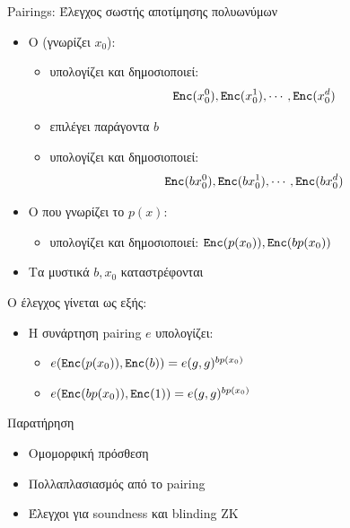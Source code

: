\documentclass[handout]{beamer}
\begin{document}
\begin{frame}[allowframebreaks]{Pairings: Έλεγχος σωστής αποτίμησης πολυωνύμων}
	\begin{itemize}
		\item O \ver (γνωρίζει $x_0$):  
		\begin{itemize}
			\item υπολογίζει και δημοσιοποιεί: \begin{align*} \mathtt{Enc}(x_0^0), \mathtt{Enc}(x_0^1), \cdots, \mathtt{Enc}(x_0^d) \end{align*}   
			\item επιλέγει παράγοντα $b$   
			\item υπολογίζει και δημοσιοποιεί: \begin{align*} \mathtt{Enc}(bx_0^0), \mathtt{Enc}(bx_0^1), \cdots, \mathtt{Enc}(bx_0^d) \end{align*}    
		\end{itemize} 
		\item O \prv που γνωρίζει το $p(x)$:  
		\begin{itemize}
			\item υπολογίζει και δημοσιοποιεί:  $\mathtt{Enc}(p(x_0)), \mathtt{Enc}(bp(x_0))$		
		\end{itemize}
		\item Τα μυστικά $b,x_0$ καταστρέφονται
	\end{itemize}
	
	\framebreak 
	Ο έλεγχος γίνεται ως εξής:
	\begin{itemize}
		\item Η συνάρτηση pairing $e$ υπολογίζει:  
		\begin{itemize}
			\item $e(\mathtt{Enc}(p(x_0)),\mathtt{Enc}(b)) = e(g,g)^{bp(x_0)}$
			\item $e(\mathtt{Enc}(bp(x_0)),\mathtt{Enc}(1)) = e(g,g)^{bp(x_0)}$
		\end{itemize}
	\end{itemize}
			
	\begin{block}{Παρατήρηση}
	\begin{itemize}
		\item Ομομορφική πρόσθεση
		\item Πολλαπλασιασμός από το pairing
		\item Έλεγχοι για soundness και blinding ZK
	\end{itemize}
	
	\end{block}
	\end{frame}
	 
\end{document}
